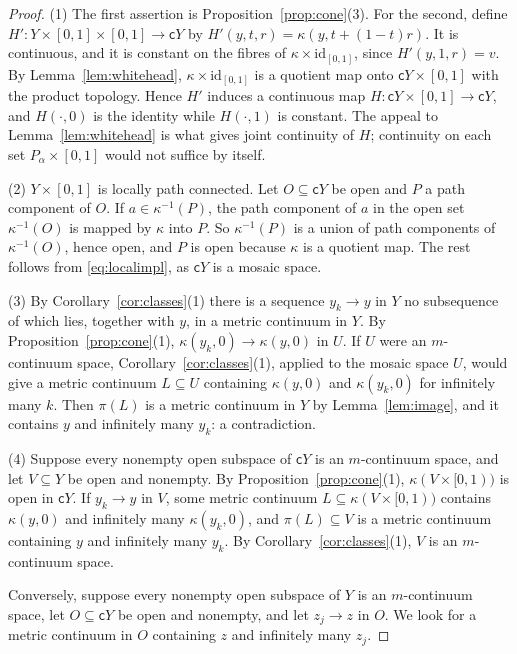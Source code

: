 \documentclass[11pt]{amsart}
\theoremstyle{definition}
\theoremstyle{remark}
\newcommand{\cone}{\mathsf{c}}
\numberwithin{equation}{section}
\begin{document}
\begin{proof}
(1) The first assertion is Proposition~\ref{prop:cone}(3). For the second, define $H'\colon Y\times[0,1]\times[0,1]\to\cone Y$ by $H'(y,t,r)=\kappa(y,t+(1-t)r)$. It is continuous, and it is constant on the fibres of $\kappa\times\mathrm{id}_{[0,1]}$, since $H'(y,1,r)=v$. By Lemma~\ref{lem:whitehead}, $\kappa\times\mathrm{id}_{[0,1]}$ is a quotient map onto $\cone Y\times[0,1]$ with the product topology. Hence $H'$ induces a continuous map $H\colon\cone Y\times[0,1]\to\cone Y$, and $H(\cdot,0)$ is the identity while $H(\cdot,1)$ is constant. The appeal to Lemma~\ref{lem:whitehead} is what gives joint continuity of $H$; continuity on each set $P_\alpha\times[0,1]$ would not suffice by itself.

(2) $Y\times[0,1]$ is locally path connected. Let $O\subseteq\cone Y$ be open and $P$ a path component of $O$. If $a\in\kappa^{-1}(P)$, the path component of $a$ in the open set $\kappa^{-1}(O)$ is mapped by $\kappa$ into $P$. So $\kappa^{-1}(P)$ is a union of path components of $\kappa^{-1}(O)$, hence open, and $P$ is open because $\kappa$ is a quotient map. The rest follows from \eqref{eq:localimpl}, as $\cone Y$ is a mosaic space.

(3) By Corollary~\ref{cor:classes}(1) there is a sequence $y_k\to y$ in $Y$ no subsequence of which lies, together with $y$, in a metric continuum in $Y$. By Proposition~\ref{prop:cone}(1), $\kappa(y_k,0)\to\kappa(y,0)$ in $U$. If $U$ were an $m$-continuum space, Corollary~\ref{cor:classes}(1), applied to the mosaic space $U$, would give a metric continuum $L\subseteq U$ containing $\kappa(y,0)$ and $\kappa(y_k,0)$ for infinitely many $k$. Then $\pi(L)$ is a metric continuum in $Y$ by Lemma~\ref{lem:image}, and it contains $y$ and infinitely many $y_k$: a contradiction.

(4) Suppose every nonempty open subspace of $\cone Y$ is an $m$-continuum space, and let $V\subseteq Y$ be open and nonempty. By Proposition~\ref{prop:cone}(1), $\kappa(V\times[0,1))$ is open in $\cone Y$. If $y_k\to y$ in $V$, some metric continuum $L\subseteq\kappa(V\times[0,1))$ contains $\kappa(y,0)$ and infinitely many $\kappa(y_k,0)$, and $\pi(L)\subseteq V$ is a metric continuum containing $y$ and infinitely many $y_k$. By Corollary~\ref{cor:classes}(1), $V$ is an $m$-continuum space.

Conversely, suppose every nonempty open subspace of $Y$ is an $m$-continuum space, let $O\subseteq\cone Y$ be open and nonempty, and let $z_j\to z$ in $O$. We look for a metric continuum in $O$ containing $z$ and infinitely many $z_j$.


\end{proof}
\end{document}
